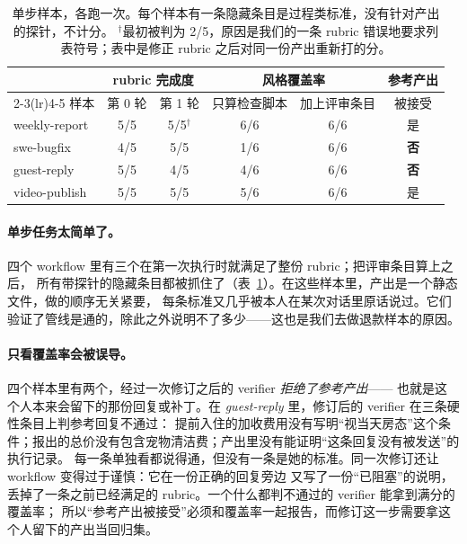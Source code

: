 \documentclass[10pt,UTF8,scheme=plain]{ctexart}
\begin{document}
\begin{table}[h]
\centering\footnotesize\setlength{\tabcolsep}{4pt}
\begin{tabular}{@{}lccccc@{}}
\toprule
 & \multicolumn{2}{c}{rubric 完成度} & \multicolumn{2}{c}{风格覆盖率} & 参考产出 \\
\cmidrule(lr){2-3}\cmidrule(lr){4-5}
样本 & 第 0 轮 & 第 1 轮 & 只算检查脚本 & 加上评审条目 & 被接受 \\
\midrule
weekly-report & 5/5 & 5/5$^{\dagger}$ & 6/6 & 6/6 & 是 \\
swe-bugfix    & 4/5 & 5/5 & 1/6 & 6/6 & \textbf{否} \\
guest-reply   & 5/5 & 4/5 & 4/6 & 6/6 & \textbf{否} \\
video-publish & 5/5 & 5/5 & 5/6 & 6/6 & 是 \\
\bottomrule
\end{tabular}
\caption{单步样本，各跑一次。每个样本有一条隐藏条目是过程类标准，没有针对产出的探针，不计分。
$^{\dagger}$最初被判为 2/5，原因是我们的一条 rubric 错误地要求列表符号；表中是修正 rubric 之后对同一份产出重新打的分。}
\label{tab:single}
\end{table}

\paragraph{单步任务太简单了。} 四个 workflow 里有三个在第一次执行时就满足了整份 rubric；把评审条目算上之后，
所有带探针的隐藏条目都被抓住了（表~\ref{tab:single}）。在这些样本里，产出是一个静态文件，做的顺序无关紧要，
每条标准又几乎被本人在某次对话里原话说过。它们验证了管线是通的，除此之外说明不了多少——这也是我们去做退款样本的原因。

\paragraph{只看覆盖率会被误导。} 四个样本里有两个，经过一次修订之后的 verifier \emph{拒绝了参考产出}——
也就是这个人本来会留下的那份回复或补丁。在 \emph{guest-reply} 里，修订后的 verifier 在三条硬性条目上判参考回复不通过：
提前入住的加收费用没有写明“视当天房态”这个条件；报出的总价没有包含宠物清洁费；产出里没有能证明“这条回复没有被发送”的执行记录。
每一条单独看都说得通，但没有一条是她的标准。同一次修订还让 workflow 变得过于谨慎：它在一份正确的回复旁边
又写了一份“已阻塞”的说明，丢掉了一条之前已经满足的 rubric。一个什么都判不通过的 verifier 能拿到满分的覆盖率；
所以“参考产出被接受”必须和覆盖率一起报告，而修订这一步需要拿这个人留下的产出当回归集。
\end{document}
